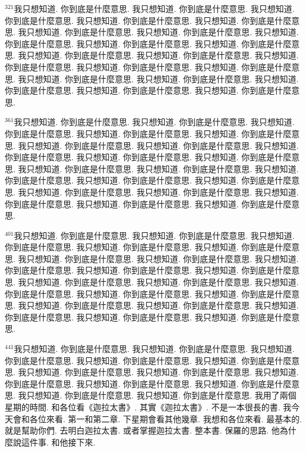 \documentclass{book}
\begin{document}
$^{321}$我只想知道.
你到底是什麼意思.
我只想知道.
你到底是什麼意思.
我只想知道.
你到底是什麼意思.
我只想知道.
你到底是什麼意思.
我只想知道.
你到底是什麼意思.
我只想知道.
你到底是什麼意思.
我只想知道.
你到底是什麼意思.
我只想知道.
你到底是什麼意思.
我只想知道.
你到底是什麼意思.
我只想知道.
你到底是什麼意思.
我只想知道.
你到底是什麼意思.
我只想知道.
你到底是什麼意思.
我只想知道.
你到底是什麼意思.
我只想知道.
你到底是什麼意思.
我只想知道.
你到底是什麼意思.
我只想知道.
你到底是什麼意思.
我只想知道.
你到底是什麼意思.
我只想知道.
你到底是什麼意思.
我只想知道.
你到底是什麼意思.
我只想知道.
你到底是什麼意思.

$^{361}$我只想知道.
你到底是什麼意思.
我只想知道.
你到底是什麼意思.
我只想知道.
你到底是什麼意思.
我只想知道.
你到底是什麼意思.
我只想知道.
你到底是什麼意思.
我只想知道.
你到底是什麼意思.
我只想知道.
你到底是什麼意思.
我只想知道.
你到底是什麼意思.
我只想知道.
你到底是什麼意思.
我只想知道.
你到底是什麼意思.
我只想知道.
你到底是什麼意思.
我只想知道.
你到底是什麼意思.
我只想知道.
你到底是什麼意思.
我只想知道.
你到底是什麼意思.
我只想知道.
你到底是什麼意思.
我只想知道.
你到底是什麼意思.
我只想知道.
你到底是什麼意思.
我只想知道.
你到底是什麼意思.
我只想知道.
你到底是什麼意思.
我只想知道.
你到底是什麼意思.

$^{401}$我只想知道.
你到底是什麼意思.
我只想知道.
你到底是什麼意思.
我只想知道.
你到底是什麼意思.
我只想知道.
你到底是什麼意思.
我只想知道.
你到底是什麼意思.
我只想知道.
你到底是什麼意思.
我只想知道.
你到底是什麼意思.
我只想知道.
你到底是什麼意思.
我只想知道.
你到底是什麼意思.
我只想知道.
你到底是什麼意思.
我只想知道.
你到底是什麼意思.
我只想知道.
你到底是什麼意思.
我只想知道.
你到底是什麼意思.
我只想知道.
你到底是什麼意思.
我只想知道.
你到底是什麼意思.
我只想知道.
你到底是什麼意思.
我只想知道.
你到底是什麼意思.
我只想知道.
你到底是什麼意思.
我只想知道.
你到底是什麼意思.
我只想知道.
你到底是什麼意思.

$^{441}$我只想知道.
你到底是什麼意思.
我只想知道.
你到底是什麼意思.
我只想知道.
你到底是什麼意思.
我只想知道.
你到底是什麼意思.
我只想知道.
你到底是什麼意思.
我只想知道.
你到底是什麼意思.
我只想知道.
你到底是什麼意思.
我只想知道.
你到底是什麼意思.
我只想知道.
你到底是什麼意思.
我只想知道.
你到底是什麼意思.
我只想知道.
你到底是什麼意思.
我只想知道.
你到底是什麼意思.
我用了兩個星期的時間.
和各位看《迦拉太書》.
其實《迦拉太書》.
不是一本很長的書.
我今天會和各位來看.
第一和第二章.
下星期會看其他幾章.
我想和各位來看.
最基本的.
就是幫助你們.
去明白迦拉太書.
或者掌握迦拉太書.
整本書.
保羅的思路.
他為什麼說這件事.
和他接下來.
\end{document}
